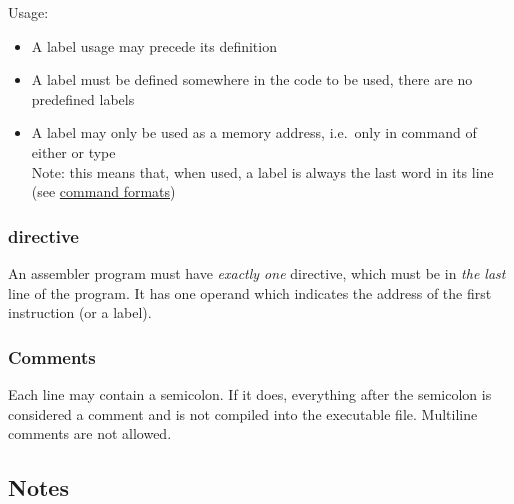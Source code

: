 Usage:

\begin{itemize}
	\item A label usage may precede its definition
    \item A label must be defined somewhere in the code to be used, there are no predefined labels
    \item A label may only be used as a memory address, i.e.\ only in command of either  or  type\\
    Note: this means that, when used, a label is always the last word in its line (see \hyperlink{command:formats}{command formats})
\end{itemize}

\subsubsection{ directive}

An assembler program must have \textit{exactly one}  directive, which must be in \textit{the last} line of the program.
It has one operand which indicates the address of the first instruction (or a label).

\subsubsection{Comments}

Each line may contain a semicolon.
If it does, everything after the semicolon is considered a comment and is not compiled into the executable file.
Multiline comments are not allowed.

\vspace{.4in}

\subsection{Notes}

